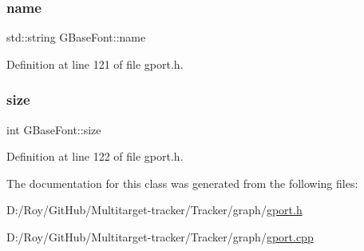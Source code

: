 \subsubsection{\texorpdfstring{name}{name}}
{\footnotesize\ttfamily std\+::string G\+Base\+Font\+::name\hspace{0.3cm}{\ttfamily [private]}}



Definition at line 121 of file gport.\+h.

\mbox{\label{class_g_base_font_a3665d1d315cccd1d1487eed589a8da0f}} 
\subsubsection{\texorpdfstring{size}{size}}
{\footnotesize\ttfamily int G\+Base\+Font\+::size\hspace{0.3cm}{\ttfamily [private]}}



Definition at line 122 of file gport.\+h.



The documentation for this class was generated from the following files\+:\begin{DoxyCompactItemize}
\item 
D\+:/\+Roy/\+Git\+Hub/\+Multitarget-\/tracker/\+Tracker/graph/\mbox{\hyperlink{gport_8h}{gport.\+h}}\item 
D\+:/\+Roy/\+Git\+Hub/\+Multitarget-\/tracker/\+Tracker/graph/\mbox{\hyperlink{gport_8cpp}{gport.\+cpp}}\end{DoxyCompactItemize}
